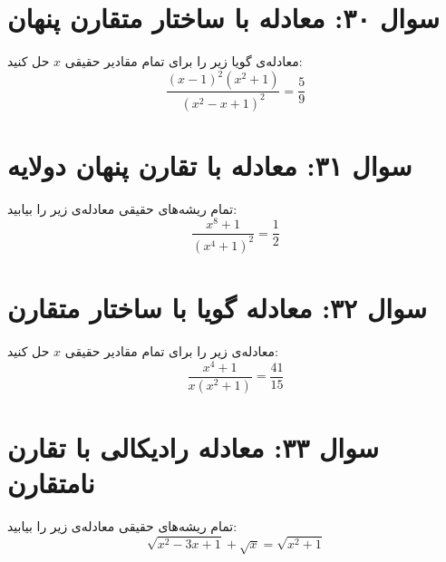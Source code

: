 \documentclass[12pt]{article}
\begin{document}
	\section*{سوال ۳۰: معادله با ساختار متقارن پنهان}
	معادله‌ی گویا زیر را برای تمام مقادیر حقیقی \(x\) حل کنید:
	\begin{displaymath}
		\frac{(x-1)^2 (x^2+1)}{(x^2-x+1)^2} = \frac{5}{9}
	\end{displaymath}
	
	\vspace{1cm}
	\hrulefill
	\vspace{1cm}
	
	
	\section*{سوال ۳۱: معادله با تقارن پنهان دولایه}
	تمام ریشه‌های حقیقی معادله‌ی زیر را بیابید:
	\begin{displaymath}
		\frac{x^8 + 1}{(x^4 + 1)^2} = \frac{1}{2}
	\end{displaymath}
	
	\vspace{1cm}
	\hrulefill
	\vspace{1cm}
	
	\section*{سوال ۳۲: معادله گویا با ساختار متقارن}
	معادله‌ی زیر را برای تمام مقادیر حقیقی \(x\) حل کنید:
	\begin{displaymath}
		\frac{x^4 + 1}{x(x^2 + 1)} = \frac{41}{15}
	\end{displaymath}
	
	\vspace{1cm}
	\hrulefill
	\vspace{1cm}
	
	\section*{سوال ۳۳: معادله رادیکالی با تقارن نامتقارن}
	تمام ریشه‌های حقیقی معادله‌ی زیر را بیابید:
	\begin{displaymath}
		\sqrt{x^2 - 3x + 1} + \sqrt{x} = \sqrt{x^2 + 1}
	\end{displaymath}
	
\end{document}
